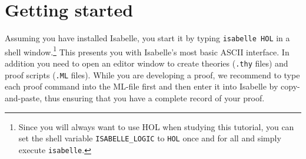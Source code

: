 \section{Getting started}

Assuming you have installed Isabelle, you start it by typing \texttt{isabelle
  HOL} in a shell window.\footnote{Since you will always want to use HOL when
  studying this tutorial, you can set the shell variable
  \texttt{ISABELLE_LOGIC} to \texttt{HOL} once and for all and simply execute
  \texttt{isabelle}.} This presents you with Isabelle's most basic ASCII
interface. In addition you need to open an editor window to create theories
(\texttt{.thy} files) and proof scripts (\texttt{.ML} files). While you are
developing a proof, we recommend to type each proof command into the ML-file
first and then enter it into Isabelle by copy-and-paste, thus ensuring that
you have a complete record of your proof.

